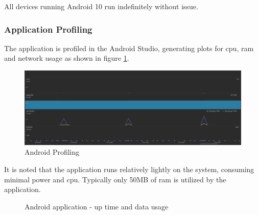 All devices running Android 10 run indefinitely without issue.

\subsubsection{Application Profiling}
The application is profiled in the Android Studio, generating plots for \ac{cpu}, \ac{ram} and network usage as shown in figure \ref{fig:android_profiling}.
\begin{figure}[H]
\centering
\includegraphics[width=6in]{android_profiling.png}
\caption{Android Profiling}
\label{fig:android_profiling}
\end{figure}
It is noted that the application runs relatively lightly on the system, consuming minimal power and \ac{cpu}.
Typically only 50MB of \ac{ram} is utilized by the application.

\begin{figure}[H]
\centering
\caption{Android application - up time and data usage}
\label{fig:performance}
\end{figure}

